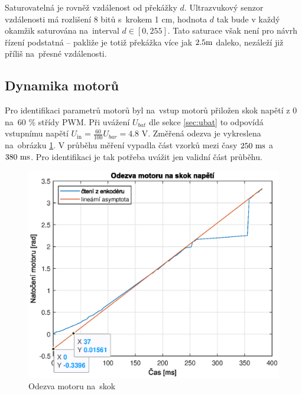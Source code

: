 \documentclass[conference]{IEEEtran}
\begin{document}
Saturovatelná je rovněž vzdálenost od překážky $d$. Ultrazvukový senzor vzdálenosti má rozlišení 8 bitů s~krokem 1 \si{\centi\metre},
hodnota $d$ tak bude v každý okamžik saturována na~interval $d \in \left[0, 255\right]$. Tato saturace však není pro návrh řízení podstatná --
pakliže je totiž překážka více jak $2.5 \text{\si{\metre}}$ daleko, nezáleží již příliš na~přesné vzdálenosti.

\subsection{Dynamika motorů}

Pro identifikaci parametrů motorů byl na~vstup motorů přiložen skok napětí z $0$ na~$60$ \% střídy PWM.
Při uvážení $U_{bat}$ dle sekce \ref{sec:ubat} to odpovídá vstupnímu napětí $U_\text{in} = \frac{60}{100} U_{bar} = 4.8$ \si{\volt}.
Změřená odezva je vykreslena na~obrázku \ref{fig:motor_skok}. V průběhu měření vypadla část vzorků mezi časy $250~\text{\si{\milli\second}}$ 
a~$380~\text{\si{\milli\second}}$. Pro identifikaci je tak potřeba uvážit jen validní část průběhu.

\begin{figure}[htbp]
    \centerline{\includegraphics[width=\linewidth]{motor_skok.eps}}
    \caption{Odezva motoru na~skok}
    \label{fig:motor_skok}        
\end{figure}
\end{document}
